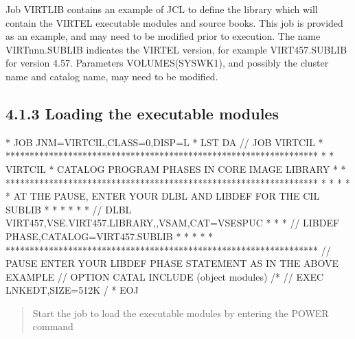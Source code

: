 \documentclass[letterpaper,10pt,english]{sphinxmanual}
\begin{document}

Job VIRTLIB contains an example of JCL to define the library which will contain the VIRTEL executable modules and source books. This job is provided as an example, and may need to be modified prior to execution. The name VIRTnnn.SUBLIB indicates the VIRTEL version, for example VIRT457.SUBLIB for version 4.57. Parameters VOLUMES(SYSWK1), and possibly the cluster name and catalog name, may need to be modified.


\subsection{4.1.3 Loading the executable modules}
\label{\detokenize{Installation_Guide:loading-the-executable-modules}}
\begin{sphinxVerbatim}[commandchars=\\\{\}]
* \PYGZdl{}\PYGZdl{} JOB JNM=VIRTCIL,CLASS=0,DISP=L
* \PYGZdl{}\PYGZdl{} LST DA
// JOB VIRTCIL
* *****************************************************************
* * VIRTCIL * CATALOG PROGRAM PHASES IN CORE IMAGE LIBRARY        *
* *****************************************************************
* *                                                               *
* * AT THE PAUSE, ENTER YOUR DLBL AND LIBDEF FOR THE CIL SUBLIB   *
* *                                                               *
* * // DLBL VIRT457,\PYGZsq{}VSE.VIRT457.LIBRARY\PYGZsq{},,VSAM,CAT=VSESPUC       *
* * // LIBDEF PHASE,CATALOG=VIRT457.SUBLIB                        *
* *                                                               *
* *****************************************************************
// PAUSE ENTER YOUR LIBDEF PHASE STATEMENT AS IN THE ABOVE EXAMPLE
// OPTION CATAL
        INCLUDE
        (object modules)
/*
// EXEC LNKEDT,SIZE=512K
/\PYGZam{}
* \PYGZdl{}\PYGZdl{} EOJ
\end{sphinxVerbatim}

\begin{quote}

Start the job to load the executable modules by entering the POWER command
\end{quote}

\begin{sphinxVerbatim}[commandchars=\\\{\}]
 
\end{sphinxVerbatim}
\end{document}
